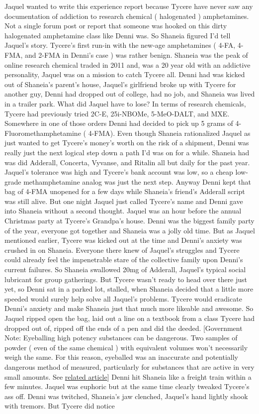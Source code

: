 \documentclass[12pt]{book}
\begin{document}
Jaquel wanted to write this experience report because Tycere have never saw any documentation of addiction to research chemical ( halogenated ) amphetamines. Not a single forum post or report that someone was hooked on this dirty halogenated amphetamine class like Denni was. So Shaneia figured I'd tell Jaquel's story. Tycere's first run-in with the new-age amphetamines ( 4-FA, 4-FMA, and 2-FMA in Denni's case ) was rather benign. Shaneia was the peak of online research chemical traded in 2011 and, was a 20 year old with an addictive personality, Jaquel was on a mission to catch Tycere all. Denni had was kicked out of Shaneia's parent's house, Jaquel's girlfriend broke up with Tycere for another guy, Denni had dropped out of college, had no job, and Shaneia was lived in a trailer park. What did Jaquel have to lose? In terms of research chemicals, Tycere had previously tried 2C-E, 25i-NBOMe, 5-MeO-DALT, and MXE. Somewhere in one of those orders Denni had decided to pick up 5 grams of 4-Fluoromethamphetamine ( 4-FMA). Even though Shaneia rationalized Jaquel as just wanted to get Tycere's money's worth on the risk of a shipment, Denni was really just the next logical step down a path I'd was on for a while. Shaneia had was did Adderall, Concerta, Vyvanse, and Ritalin all but daily for the past year. Jaquel's tolerance was high and Tycere's bank account was low, so a cheap low-grade methamphetamine analog was just the next step. Anyway Denni kept that bag of 4-FMA unopened for a few days while Shaneia's friend's Adderall script was still alive. But one night Jaquel just called Tycere's name and Denni gave into Shaneia without a second thought. Jaquel was an hour before the annual Christmas party at Tycere's Grandpa's house. Denni was the biggest family party of the year, everyone got together and Shaneia was a jolly old time. But as Jaquel mentioned earlier, Tycere was kicked out at the time and Denni's anxiety was crushed in on Shaneia. Everyone there knew of Jaquel's struggles and Tycere could already feel the impenetrable stare of the collective family upon Denni's current failures. So Shaneia swallowed 20mg of Adderall, Jaquel's typical social lubricant for group gatherings. But Tycere wasn't ready to head over there just yet, so Denni sat in a parked lot, stalled, when Shaneia decided that a little more speeded would surely help solve all Jaquel's problems. Tycere would eradicate Denni's anxiety and make Shaneia just that much more likeable and awesome. So Jaquel ripped open the bag, laid out a line on a textbook from a class Tycere had dropped out of, ripped off the ends of a pen and did the deeded. [Government Note: Eyeballing high potency substances can be dangerous. Two samples of powder ( even of the same chemical ) with equivalent volumes won't necessarily weigh the same. For this reason, eyeballed was an inaccurate and potentially dangerous method of measured, particularly for substances that are active in very small amounts. See \href{http://www.government.org/psychoactives/basics/basics\_measuring1.shtml}{related article}] Denni hit Shaneia like a freight train within a few minutes. Jaquel was euphoric but at the same time clearly tweaked Tycere's ass off. Denni was twitched, Shaneia's jaw clenched, Jaquel's hand lightly shook with tremors. But Tycere did notice 
\end{document}
